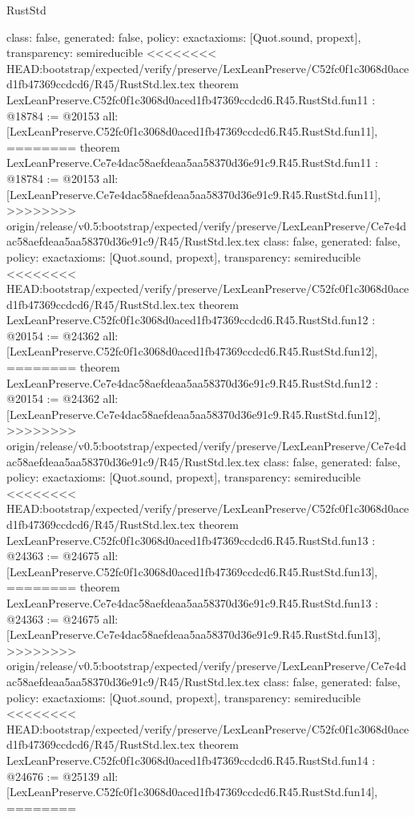 \begin{lexlean}{RustStd}
\begin{coremodule}
{\begin{coremodule}
{{{{{{{{{{{{{{  class: false,
  generated: false,
  policy: exact{axioms: [Quot.sound, propext]},
  transparency: semireducible
}
<<<<<<<< HEAD:bootstrap/expected/verify/preserve/LexLeanPreserve/C52fc0f1c3068d0aced1fb47369ccdcd6/R45/RustStd.lex.tex
theorem LexLeanPreserve.C52fc0f1c3068d0aced1fb47369ccdcd6.R45.RustStd.fun11 : @18784 := @20153 {
  all: [LexLeanPreserve.C52fc0f1c3068d0aced1fb47369ccdcd6.R45.RustStd.fun11],
========
theorem LexLeanPreserve.Ce7e4dac58aefdeaa5aa58370d36e91c9.R45.RustStd.fun11 : @18784 := @20153 {
  all: [LexLeanPreserve.Ce7e4dac58aefdeaa5aa58370d36e91c9.R45.RustStd.fun11],
>>>>>>>> origin/release/v0.5:bootstrap/expected/verify/preserve/LexLeanPreserve/Ce7e4dac58aefdeaa5aa58370d36e91c9/R45/RustStd.lex.tex
  class: false,
  generated: false,
  policy: exact{axioms: [Quot.sound, propext]},
  transparency: semireducible
}
<<<<<<<< HEAD:bootstrap/expected/verify/preserve/LexLeanPreserve/C52fc0f1c3068d0aced1fb47369ccdcd6/R45/RustStd.lex.tex
theorem LexLeanPreserve.C52fc0f1c3068d0aced1fb47369ccdcd6.R45.RustStd.fun12 : @20154 := @24362 {
  all: [LexLeanPreserve.C52fc0f1c3068d0aced1fb47369ccdcd6.R45.RustStd.fun12],
========
theorem LexLeanPreserve.Ce7e4dac58aefdeaa5aa58370d36e91c9.R45.RustStd.fun12 : @20154 := @24362 {
  all: [LexLeanPreserve.Ce7e4dac58aefdeaa5aa58370d36e91c9.R45.RustStd.fun12],
>>>>>>>> origin/release/v0.5:bootstrap/expected/verify/preserve/LexLeanPreserve/Ce7e4dac58aefdeaa5aa58370d36e91c9/R45/RustStd.lex.tex
  class: false,
  generated: false,
  policy: exact{axioms: [Quot.sound, propext]},
  transparency: semireducible
}
<<<<<<<< HEAD:bootstrap/expected/verify/preserve/LexLeanPreserve/C52fc0f1c3068d0aced1fb47369ccdcd6/R45/RustStd.lex.tex
theorem LexLeanPreserve.C52fc0f1c3068d0aced1fb47369ccdcd6.R45.RustStd.fun13 : @24363 := @24675 {
  all: [LexLeanPreserve.C52fc0f1c3068d0aced1fb47369ccdcd6.R45.RustStd.fun13],
========
theorem LexLeanPreserve.Ce7e4dac58aefdeaa5aa58370d36e91c9.R45.RustStd.fun13 : @24363 := @24675 {
  all: [LexLeanPreserve.Ce7e4dac58aefdeaa5aa58370d36e91c9.R45.RustStd.fun13],
>>>>>>>> origin/release/v0.5:bootstrap/expected/verify/preserve/LexLeanPreserve/Ce7e4dac58aefdeaa5aa58370d36e91c9/R45/RustStd.lex.tex
  class: false,
  generated: false,
  policy: exact{axioms: [Quot.sound, propext]},
  transparency: semireducible
}
<<<<<<<< HEAD:bootstrap/expected/verify/preserve/LexLeanPreserve/C52fc0f1c3068d0aced1fb47369ccdcd6/R45/RustStd.lex.tex
theorem LexLeanPreserve.C52fc0f1c3068d0aced1fb47369ccdcd6.R45.RustStd.fun14 : @24676 := @25139 {
  all: [LexLeanPreserve.C52fc0f1c3068d0aced1fb47369ccdcd6.R45.RustStd.fun14],
========
}}}}}}}}}}}}}}}}}
\end{coremodule}}
\end{coremodule}
\end{lexlean}
